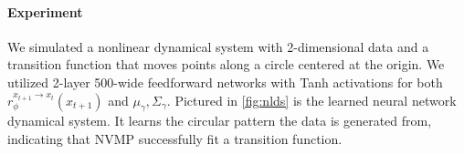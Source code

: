 \paragraph{Experiment} We simulated a nonlinear dynamical system
with 2-dimensional data and a transition function
that moves points along a circle centered at the origin.
We utilized 2-layer 500-wide feedforward networks with Tanh activations
for both $r^{x_{t + 1} \rightarrow x_t}_\phi(x_{t + 1})$ and $\mu_\gamma, \Sigma_\gamma$.
Pictured in \autoref{fig:nlds} is the learned neural network dynamical system.
It learns the circular pattern the data is generated from, indicating
that NVMP successfully fit a transition function.

%
%
%

